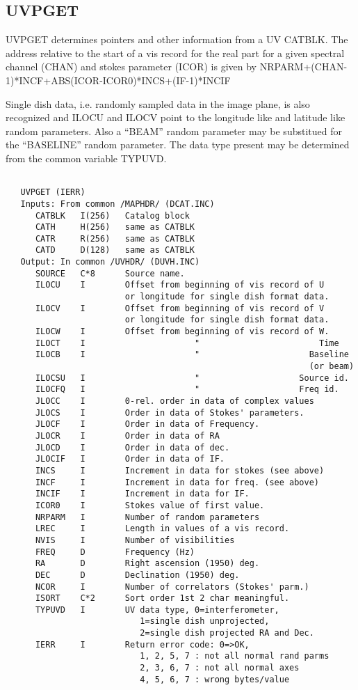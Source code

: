 \subsection{UVPGET}
UVPGET determines pointers and other information from a UV CATBLK.
The address relative to the start of a vis record for the real part
for a given spectral channel (CHAN) and stokes parameter (ICOR)
is given by NRPARM+(CHAN-1)*INCF+ABS(ICOR-ICOR0)*INCS+(IF-1)*INCIF

Single dish data, i.e. randomly sampled data in the image plane, is
also recognized and ILOCU and ILOCV point to the longitude like and
latitude like random parameters.  Also a ``BEAM'' random parameter
may be substitued for the ``BASELINE'' random parameter.  The data
type present may be determined from the common variable TYPUVD.
\begin{verbatim}

   UVPGET (IERR)
   Inputs: From common /MAPHDR/ (DCAT.INC)
      CATBLK   I(256)   Catalog block
      CATH     H(256)   same as CATBLK
      CATR     R(256)   same as CATBLK
      CATD     D(128)   same as CATBLK
   Output: In common /UVHDR/ (DUVH.INC)
      SOURCE   C*8      Source name.
      ILOCU    I        Offset from beginning of vis record of U
                        or longitude for single dish format data.
      ILOCV    I        Offset from beginning of vis record of V
                        or longitude for single dish format data.
      ILOCW    I        Offset from beginning of vis record of W.
      ILOCT    I                      "                        Time
      ILOCB    I                      "                      Baseline
                                                             (or beam)
      ILOCSU   I                      "                    Source id.
      ILOCFQ   I                      "                    Freq id.
      JLOCC    I        0-rel. order in data of complex values
      JLOCS    I        Order in data of Stokes' parameters.
      JLOCF    I        Order in data of Frequency.
      JLOCR    I        Order in data of RA
      JLOCD    I        Order in data of dec.
      JLOCIF   I        Order in data of IF.
      INCS     I        Increment in data for stokes (see above)
      INCF     I        Increment in data for freq. (see above)
      INCIF    I        Increment in data for IF.
      ICOR0    I        Stokes value of first value.
      NRPARM   I        Number of random parameters
      LREC     I        Length in values of a vis record.
      NVIS     I        Number of visibilities
      FREQ     D        Frequency (Hz)
      RA       D        Right ascension (1950) deg.
      DEC      D        Declination (1950) deg.
      NCOR     I        Number of correlators (Stokes' parm.)
      ISORT    C*2      Sort order 1st 2 char meaningful.
      TYPUVD   I        UV data type, 0=interferometer,
                           1=single dish unprojected,
                           2=single dish projected RA and Dec.
      IERR     I        Return error code: 0=>OK,
                           1, 2, 5, 7 : not all normal rand parms
                           2, 3, 6, 7 : not all normal axes
                           4, 5, 6, 7 : wrong bytes/value
\end{verbatim}

